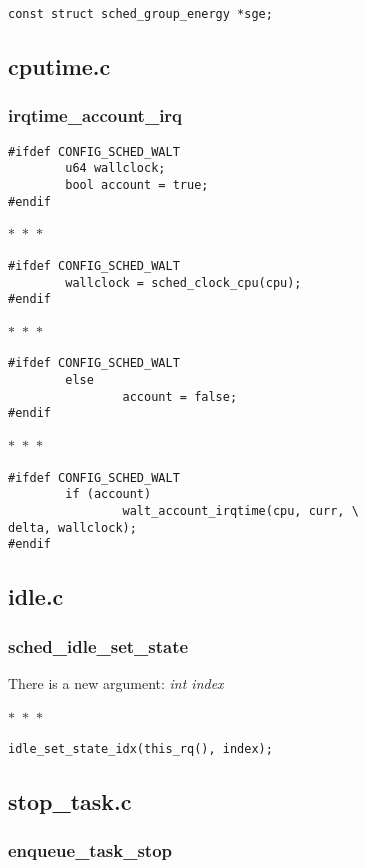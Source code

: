 \documentclass{article}
\newcommand{\divider}{{\begin{center}
  $\ast$~$\ast$~$\ast$
\end{center}}}
\begin{document}
\begin{verbatim}
const struct sched_group_energy *sge;
\end{verbatim}

\subsection{cputime.c}

\subsubsection{irqtime\_account\_irq}

\begin{verbatim}
#ifdef CONFIG_SCHED_WALT
        u64 wallclock;
        bool account = true;
#endif
\end{verbatim}
\divider
\begin{verbatim}
#ifdef CONFIG_SCHED_WALT
        wallclock = sched_clock_cpu(cpu);
#endif
\end{verbatim}
\divider
\begin{verbatim}
#ifdef CONFIG_SCHED_WALT
        else
                account = false;
#endif
\end{verbatim}
\divider
\begin{verbatim}
#ifdef CONFIG_SCHED_WALT
        if (account)
                walt_account_irqtime(cpu, curr, \
delta, wallclock);
#endif
\end{verbatim}

\subsection{idle.c}

\subsubsection{sched\_idle\_set\_state}

There is a new argument: \textit{int index}

\divider
\begin{verbatim}
idle_set_state_idx(this_rq(), index);
\end{verbatim}

\subsection{stop\_task.c}

\subsubsection{enqueue\_task\_stop}
\end{document}
